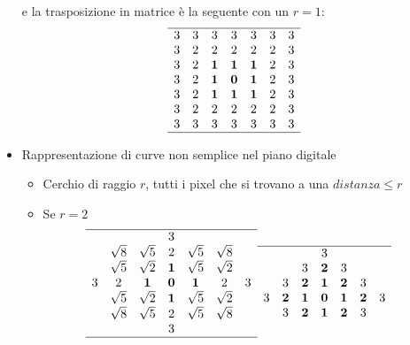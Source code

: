 \documentclass{report}
\begin{document}
\begin{itemize}
  e la trasposizione in matrice è la seguente con un $r=1$:
    \begin{equation*}
    \begin{array}[ht!]{ccccccc}
      \hline
      3 & 3 & 3 & 3 & 3 & 3 & 3\\
      3 & 2 & 2 & 2 & 2 & 2 & 3\\
      3 & 2 & \textbf{1} & \textbf{1} & \textbf{1} & 2 & 3\\
      3 & 2 & \textbf{1} & \textbf{0} & \textbf{1} & 2 & 3\\
      3 & 2 & \textbf{1} & \textbf{1} & \textbf{1} & 2 & 3\\
      3 & 2 & 2 & 2 & 2 & 2 & 3\\
      3 & 3 & 3 & 3 & 3 & 3 & 3\\\hline
    \end{array}
  \end{equation*}
\item Rappresentazione di curve non semplice nel piano digitale
  \begin{itemize}
  \item Cerchio di raggio $r$, tutti i pixel che si trovano a una
    $distanza \leq r$
  \item Se $r=2$
    \begin{eqnarray*}
      \begin{array}[ht!]{ccccccc}
        \hline
        &&&3&&&\\
        & \sqrt{8} & \sqrt{5} & 2 & \sqrt{5} & \sqrt{8}\\
        & \sqrt{5} & \sqrt{2} & \textbf{1} & \sqrt{5} & \sqrt{2}\\
        3 & 2 & \textbf{1} & \textbf{0} & \textbf{1} & 2 & 3\\
        & \sqrt{5} & \sqrt{2} & \textbf{1} & \sqrt{5} & \sqrt{2}\\
        & \sqrt{8} & \sqrt{5} & 2 & \sqrt{5} & \sqrt{8}\\
        &&&3&&&\\\hline
      \end{array} &
                          \begin{array}[ht!]{ccccccc}
        \hline
        &&&3&&&\\
        &&3 & \textbf{2} & 3 &&\\
        &3& \textbf{2} & \textbf{1} & \textbf{2} & 3& \\
        3 & \textbf{2} & \textbf{1} & \textbf{0} & \textbf{1} & \textbf{2} & 3\\
        &3&\textbf{2} & \textbf{1} & \textbf{2}&3& \\

\end{array}
\end{eqnarray*}
\end{itemize}
\end{itemize}
\end{document}
